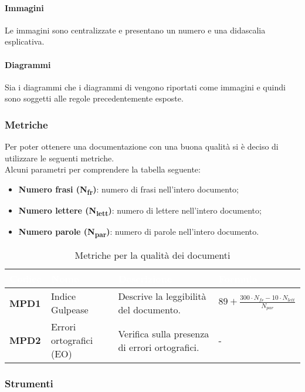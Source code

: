 \paragraph{Immagini}

Le immagini sono centralizzate e presentano un numero e una didascalia esplicativa.

\paragraph{Diagrammi}

Sia i diagrammi  che i diagrammi di  vengono riportati come immagini e quindi sono soggetti alle regole precedentemente esposte.
\subsubsection{Metriche}
Per poter ottenere una documentazione con una buona qualità si è deciso di utilizzare le seguenti metriche.\\
Alcuni parametri per comprendere la tabella seguente:
	\begin{itemize}
		\item \textbf{Numero frasi (N\textsubscript{fr})}: numero di frasi nell'intero documento;
		\item \textbf{Numero lettere (N\textsubscript{lett})}: numero di lettere nell'intero documento;
		\item \textbf{Numero parole (N\textsubscript{par})}: numero di parole nell'intero documento.
	\end{itemize}
\renewcommand{\arraystretch}{1.5}
\renewcommand\extrarowheight{1.5pt}
\begin{longtable}{C{1.5cm} C{4.5cm} C{5.5cm} C{5cm}}
		\textcolor{white}{\textbf{Codice}} & 
		\textcolor{white}{\textbf{Nome}} & 
		\textcolor{white}{\textbf{Descrizione}} & 
		\textcolor{white}{\textbf{Formula}} \\
		\endfirsthead
	    \endfoot
	    \caption{Metriche per la qualità dei documenti}
	    \endlastfoot
		\hline
		\textbf{MPD1} & 
		Indice Gulpease & 
		Descrive la leggibilità del documento. & 
		$ 89 + \frac{300 \cdot N_{fr} - 10 \cdot N_{lett}}{N_{par}}$ \\
		\textbf{MPD2} & 
		Errori ortografici (EO) & 
		Verifica sulla presenza di errori ortografici. & 
		- \\
\end{longtable}
\subsubsection{Strumenti}
